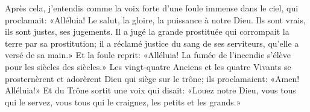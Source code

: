 Après cela, j’entendis comme la voix forte
	d’une foule immense dans le ciel, qui proclamait:
	«Alléluia! Le salut, la gloire, la puissance à notre Dieu.
	Ils sont vrais, ils sont justes, ses jugements.
Il a jugé la grande prostituée qui corrompait la terre par sa prostitution;
	il a réclamé justice du sang de ses serviteurs,
	qu’elle a versé de sa main.»
Et la foule reprit:
	«Alléluia! La fumée de l’incendie s’élève pour les siècles des siècles.»
Les vingt-quatre Anciens et les quatre Vivants se prosternèrent
	et adorèrent Dieu qui siège sur le trône;
	ils proclamaient: «Amen! Alléluia!»
Et du Trône sortit une voix qui disait:
	«Louez notre Dieu, vous tous qui le servez,
	vous tous qui le craignez, les petits et les grands.»
